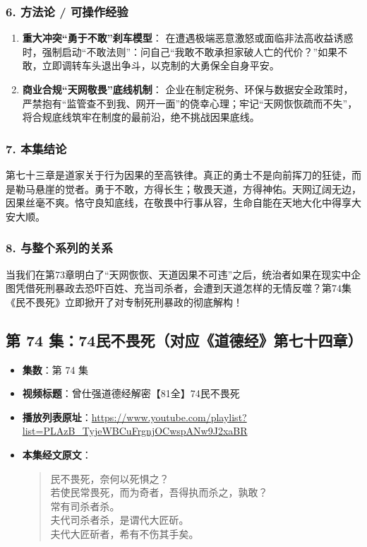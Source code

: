 \subsubsection{6. 方法论 / 可操作经验}
\begin{enumerate}
    \item \textbf{重大冲突“勇于不敢”刹车模型}：
    在遭遇极端恶意激怒或面临非法高收益诱惑时，强制启动“不敢法则”：问自己“我敢不敢承担家破人亡的代价？”如果不敢，立即调转车头退出争斗，以克制的大勇保全自身平安。
    \item \textbf{商业合规“天网敬畏”底线机制}：
    企业在制定税务、环保与数据安全政策时，严禁抱有“监管查不到我、网开一面”的侥幸心理；牢记“天网恢恢疏而不失”，将合规底线筑牢在制度的最前沿，绝不挑战因果底线。
\end{enumerate}

\subsubsection{7. 本集结论}
第七十三章是道家关于行为因果的至高铁律。真正的勇士不是向前挥刀的狂徒，而是勒马悬崖的觉者。勇于不敢，方得长生；敬畏天道，方得神佑。天网辽阔无边，因果丝毫不爽。恪守良知底线，在敬畏中行事从容，生命自能在天地大化中得享大安大顺。

\subsubsection{8. 与整个系列的关系}
当我们在第73章明白了“天网恢恢、天道因果不可违”之后，统治者如果在现实中企图凭借死刑暴政去恐吓百姓、充当司杀者，会遭到天道怎样的无情反噬？第74集《民不畏死》立即掀开了对专制死刑暴政的彻底解构！

\clearpage

\subsection{第 74 集：74民不畏死（对应《道德经》第七十四章）}
\label{sec:ep74}

\begin{itemize}
    \item \textbf{集数}：第 74 集
    \item \textbf{视频标题}：曾仕强道德经解密【81全】74民不畏死
    \item \textbf{播放列表原址}：\url{https://www.youtube.com/playlist?list=PLAzB_TyjeWBCuFrgnjOCwspANw9J2xaBR}
    \item \textbf{本集经文原文}：
    \begin{quote}\kaishu
    民不畏死，奈何以死惧之？\\
    若使民常畏死，而为奇者，吾得执而杀之，孰敢？\\
    常有司杀者杀。\\
    夫代司杀者杀，是谓代大匠斫。\\
    夫代大匠斫者，希有不伤其手矣。
    \end{quote}
\end{itemize}

